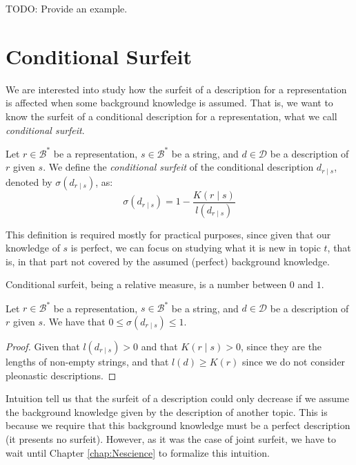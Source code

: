 \begin{example}
\label{ex:surfeit_non_comparison}
{\color{red} TODO: Provide an example.}
\end{example}


%
%

\section{Conditional Surfeit}

We are interested into study how the surfeit of a description for a representation is affected when some background knowledge is assumed. That is, we want to know the surfeit of a conditional description for a representation, what we call \emph{conditional surfeit}.

\begin{definition}
Let $r \in \mathcal{B}^\ast$ be a representation, $s \in \mathcal{B}^\ast$ be a string, and $d \in \mathcal{D}$ be a description of $r$ given $s$. We define the \emph{conditional surfeit} of the conditional description $d_{r \mid s}$, denoted by $\sigma(d_{r \mid s})$, as: 
\[
\sigma(d_{r \mid s}) = 1 - \frac{K\left( r \mid s \right)}{l \left( d_{r \mid s} \right)}
\]
\end{definition}

This definition is required mostly for practical purposes, since given that our knowledge of $s$ is perfect, we can focus on studying what it is new in topic $t$, that is, in that part not covered by the assumed (perfect) background knowledge.

Conditional surfeit, being a relative measure, is a number between $0$ and $1$.

\begin{proposition}
Let $r \in \mathcal{B}^\ast$ be a representation, $s \in \mathcal{B}^\ast$ be a string, and $d \in \mathcal{D}$ be a description of $r$ given $s$. We have that $0 \leq \sigma(d_{r \mid s}) \leq 1$.
\end{proposition}
\begin{proof}
Given that $l \left( d_{r \mid s} \right) > 0$ and that $K\left( r \mid s \right) > 0$, since they are the lengths of non-empty strings, {\color{red} and that $l\left( d \right) \geq K\left( r \right)$ since we do not consider pleonastic descriptions}.

\end{proof}

Intuition tell us that the surfeit of a description could only decrease if we assume the background knowledge given by the description of another topic. This is because we require that this background knowledge must be a perfect description (it presents no surfeit). However, as it was the case of joint surfeit, we have to wait until Chapter \ref{chap:Nescience} to formalize this intuition.

